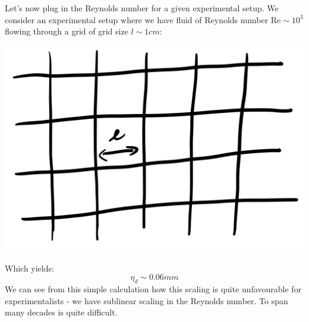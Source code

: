 Let's now plug in the Reynolds number for a given experimental setup. We consider an experimental setup where we have fluid of Reynolds number $\text{Re} \sim 10^3$ flowing through a grid of grid size $l \sim \text{1}\si{cm}$:

\begin{center}
    \includegraphics[scale=0.35]{Lectures/Images/lec13-lattice.png}
\end{center}

Which yields:
\begin{equation}
    \eta_d \sim 0.06\si{mm}
\end{equation}
We can see from this simple calculation how this scaling is quite unfavourable for experimentalists - we have sublinear scaling in the Reynolds number. To span many decades is quite difficult.

